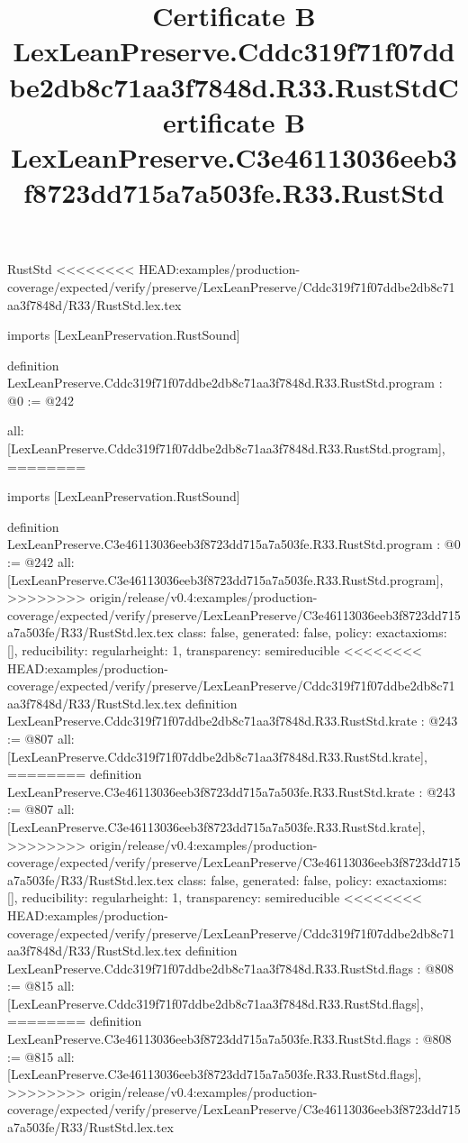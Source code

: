 \begin{lexlean}{RustStd}
<<<<<<<< HEAD:examples/production-coverage/expected/verify/preserve/LexLeanPreserve/Cddc319f71f07ddbe2db8c71aa3f7848d/R33/RustStd.lex.tex
\title{Certificate B LexLeanPreserve.Cddc319f71f07ddbe2db8c71aa3f7848d.R33.RustStd}
\begin{coremodule}
imports [LexLeanPreservation.RustSound]

definition LexLeanPreserve.Cddc319f71f07ddbe2db8c71aa3f7848d.R33.RustStd.program : @0 := @242 {
  all: [LexLeanPreserve.Cddc319f71f07ddbe2db8c71aa3f7848d.R33.RustStd.program],
========
\title{Certificate B LexLeanPreserve.C3e46113036eeb3f8723dd715a7a503fe.R33.RustStd}
\begin{coremodule}
imports [LexLeanPreservation.RustSound]

definition LexLeanPreserve.C3e46113036eeb3f8723dd715a7a503fe.R33.RustStd.program : @0 := @242 {
  all: [LexLeanPreserve.C3e46113036eeb3f8723dd715a7a503fe.R33.RustStd.program],
>>>>>>>> origin/release/v0.4:examples/production-coverage/expected/verify/preserve/LexLeanPreserve/C3e46113036eeb3f8723dd715a7a503fe/R33/RustStd.lex.tex
  class: false,
  generated: false,
  policy: exact{axioms: []},
  reducibility: regular{height: 1},
  transparency: semireducible
}
<<<<<<<< HEAD:examples/production-coverage/expected/verify/preserve/LexLeanPreserve/Cddc319f71f07ddbe2db8c71aa3f7848d/R33/RustStd.lex.tex
definition LexLeanPreserve.Cddc319f71f07ddbe2db8c71aa3f7848d.R33.RustStd.krate : @243 := @807 {
  all: [LexLeanPreserve.Cddc319f71f07ddbe2db8c71aa3f7848d.R33.RustStd.krate],
========
definition LexLeanPreserve.C3e46113036eeb3f8723dd715a7a503fe.R33.RustStd.krate : @243 := @807 {
  all: [LexLeanPreserve.C3e46113036eeb3f8723dd715a7a503fe.R33.RustStd.krate],
>>>>>>>> origin/release/v0.4:examples/production-coverage/expected/verify/preserve/LexLeanPreserve/C3e46113036eeb3f8723dd715a7a503fe/R33/RustStd.lex.tex
  class: false,
  generated: false,
  policy: exact{axioms: []},
  reducibility: regular{height: 1},
  transparency: semireducible
}
<<<<<<<< HEAD:examples/production-coverage/expected/verify/preserve/LexLeanPreserve/Cddc319f71f07ddbe2db8c71aa3f7848d/R33/RustStd.lex.tex
definition LexLeanPreserve.Cddc319f71f07ddbe2db8c71aa3f7848d.R33.RustStd.flags : @808 := @815 {
  all: [LexLeanPreserve.Cddc319f71f07ddbe2db8c71aa3f7848d.R33.RustStd.flags],
========
definition LexLeanPreserve.C3e46113036eeb3f8723dd715a7a503fe.R33.RustStd.flags : @808 := @815 {
  all: [LexLeanPreserve.C3e46113036eeb3f8723dd715a7a503fe.R33.RustStd.flags],
>>>>>>>> origin/release/v0.4:examples/production-coverage/expected/verify/preserve/LexLeanPreserve/C3e46113036eeb3f8723dd715a7a503fe/R33/RustStd.lex.tex
}}}
\end{coremodule}}
\end{coremodule}
\end{lexlean}

